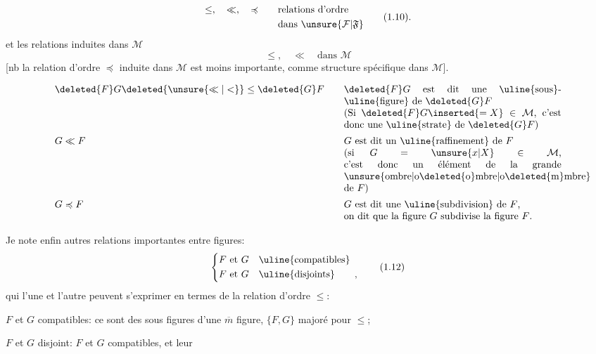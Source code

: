 \[
\begin{aligned}
\leq,\quad\ll,\quad\preccurlyeq&\qquad\text{relations d'ordre}\\
&\qquad\text{dans }\unsure{\mathcal{F}|\mathfrak{F}}
\end{aligned}\tag*{(1.10).}
\]
et les relations induites dans $\mathcal{M}$
\[
\leq,\quad\ll\quad\text{dans }\mathcal{M}\tag*{(1.11)}
\]
[nb la relation d'ordre $\preccurlyeq$ induite dans $\mathcal{M}$ est moins importante, comme structure spécifique dans $\mathcal{M}$].

\[
\begin{array}{@{}l@{\qquad}p{.64\linewidth}@{}}
\deleted{F}G\deleted{\unsure{\ll|<}}\leq\deleted{G}F & $\deleted{F}G$ est dit une \uline{sous}-\uline{figure} de $\deleted{G}F$\\
& (Si $\deleted{F}G\inserted{=X}\in\mathcal{M}$, c'est donc une \uline{strate} de $\deleted{G}F$)\\[.45em]
G\ll F & $G$ est dit un \uline{raffinement} de $F$\\
& (si $G=\unsure{x|X}\in\mathcal{M}$, c'est donc un élément de la grande \unsure{ombre|o\deleted{o}mbre|o\deleted{m}mbre} de $F$)\\[.45em]
G\preccurlyeq F & $G$ est dit une \uline{subdivision} de $F$,\\
& on dit que la figure $G$ subdivise la figure $F$.
\end{array}
\]

Je note enfin  autres relations importantes  entre figures:
\[
\left\{\begin{aligned}
F\text{ et }G&\quad\text{\uline{compatibles}}\\
F\text{ et }G&\quad\text{\uline{disjoints}}\qquad,
\end{aligned}\right.\tag*{(1.12)}
\]
qui l'une et l'autre peuvent s'exprimer en termes de la relation d'ordre $\leq$:

$F$ et $G$ compatibles: ce sont des sous figures d'une $\overline m$ figure,  $\{F,G\}$ majoré pour $\leq$;

$F$ et $G$ disjoint: $F$ et $G$ compatibles, et leur
